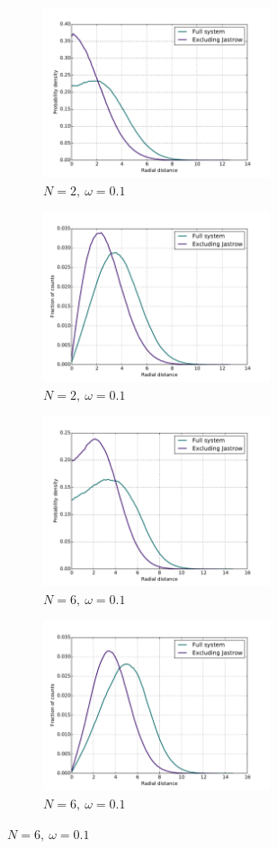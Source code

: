 \documentclass[english, a4paper]{article}
\begin{document}
\begin{figure}[H]
	
	\begin{subfigure}{0.5\textwidth}
		\includegraphics[width=\textwidth, height= 5cm]{figures/radialDistribution/OneBodyDensityN2w10Se7.pdf}
		\caption{$N=2,\:\omega=0.1$}
	\end{subfigure}
	\begin{subfigure}{0.5\textwidth}
		\includegraphics[width=\textwidth, height= 5cm]{figures/radialDistribution/radialDistributionN2w10Se7.pdf}
		\caption{$N=2,\:\omega=0.1$}
	\end{subfigure}
	
	\vspace{1mm}
	
	\begin{subfigure}{0.5\textwidth}
		\includegraphics[width=\textwidth, height= 5cm]{figures/radialDistribution/OneBodyDensityN6w10Se7.pdf}
		\caption{$N=6,\:\omega=0.1$}
	\end{subfigure}
	\begin{subfigure}{0.5\textwidth}
		\includegraphics[width=\textwidth, height= 5cm]{figures/radialDistribution/radialDistributionN6w10Se7.pdf}
		\caption{$N=6,\:\omega=0.1$}
	\end{subfigure}
	

\end{figure}
\end{document}
